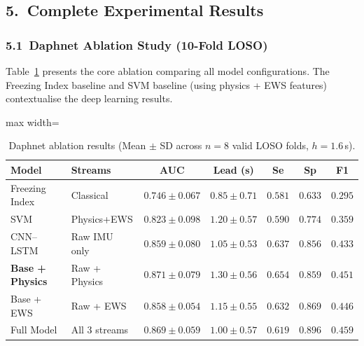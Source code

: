 \documentclass[12pt,a4paper]{article}
\begin{document}
\subsection*{5.\ Complete Experimental Results}

\subsubsection*{5.1\ Daphnet Ablation Study (10-Fold LOSO)}

Table~\ref{tab:ablation} presents the core ablation comparing all model configurations. The
Freezing Index baseline and SVM baseline (using physics + EWS features) contextualise the
deep learning results.

\begin{table}[ht]
\centering
\caption{Daphnet ablation results (Mean $\pm$ SD across $n=8$ valid LOSO folds, $h=1.6$\,s).}
\label{tab:ablation}
\renewcommand{\arraystretch}{1.25}
\begin{adjustbox}{max width=\textwidth}
\begin{tabular}{llccccc}
\toprule
\textbf{Model} & \textbf{Streams} & \textbf{AUC} & \textbf{Lead (s)} & \textbf{Se} & \textbf{Sp} & \textbf{F1} \\
\midrule
Freezing Index & Classical & $0.746\!\pm\!0.067$ & $0.85\!\pm\!0.71$ & $0.581$ & $0.633$ & $0.295$ \\
SVM            & Physics+EWS & $0.823\!\pm\!0.098$ & $1.20\!\pm\!0.57$ & $0.590$ & $0.774$ & $0.359$ \\
\midrule
CNN--LSTM      & Raw IMU only  & $0.859\!\pm\!0.080$ & $1.05\!\pm\!0.53$ & $0.637$ & $0.856$ & $0.433$ \\
\textbf{Base + Physics} & Raw + Physics & $\mathbf{0.871\!\pm\!0.079}$ & $\mathbf{1.30\!\pm\!0.56}$ & $\mathbf{0.654}$ & $0.859$ & $0.451$ \\
Base + EWS     & Raw + EWS     & $0.858\!\pm\!0.054$ & $1.15\!\pm\!0.55$ & $0.632$ & $0.869$ & $0.446$ \\
Full Model     & All 3 streams & $0.869\!\pm\!0.059$ & $1.00\!\pm\!0.57$ & $0.619$ & $\mathbf{0.896}$ & $\mathbf{0.459}$ \\
\bottomrule
\end{tabular}
\end{adjustbox}
\end{table}

\vspace{6pt}
\end{document}
